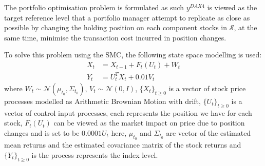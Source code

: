 The portfolio optimisation problem is formulated as such $y^{DAX4}$ is viewed as the target reference level that a portfolio manager attempt to replicate as close as possible by changing the holding position on each component stocks in $\mathcal{S}$, at the same time, minimise the transaction cost incurred in position changes.
 
To solve this problem using the SMC,  the following state space modelling is used:
\begin{align}
  X_t &= X_{t-1} + F_t(U_t) + W_t \\
  Y_t &= U^T_tX_t + 0.01V_t
\end{align}
where $W_t \sim \mathcal{N}(\mu_{t_0}, \Sigma_{t_0})$, $V_t \sim \mathcal{N}(0, I)$, $\{X_t\}_{t \geq 0}$ is a vector of stock price processes modelled as Arithmetic Brownian Motion with drift, $\{U_t\}_{t \geq 0}$ is a vector of control input processes, each represents the position we have for each stock, $F_t(U_t)$ can be viewed as the market impact on price due to position changes and is set to be $0.0001U_t$ here, $\mu_{t_0}$ and $\Sigma_{t_0}$ are vector of the estimated mean returns and the estimated covariance matrix of the stock returns and $\{Y_t\}_{t \geq 0}$ is the process represents the index level.

